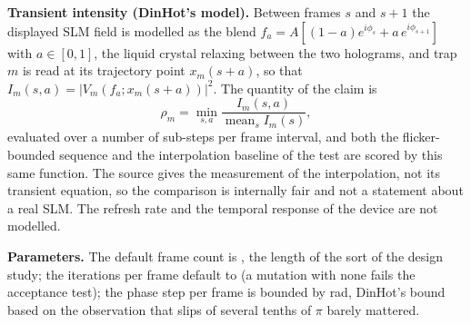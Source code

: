 \textbf{Transient intensity (DinHot's model).} Between frames $s$ and $s+1$ the displayed SLM field is modelled as the blend $f_a=A[(1-a)e^{i\phi_s}+a\,e^{i\phi_{s+1}}]$ with $a\in[0,1]$, the liquid crystal relaxing between the two holograms, and trap $m$ is read at its trajectory point $x_m(s+a)$, so that $I_m(s,a)=|V_m(f_a;x_m(s+a))|^2$. The quantity of the claim is
\begin{equation}
\rho_m=\min_{s,a}\frac{I_m(s,a)}{\operatorname{mean}_sI_m(s)},
\label{eq:b2-ratio}
\end{equation}
evaluated over a number of sub-steps per frame interval, and both the flicker-bounded sequence and the interpolation baseline of the test are scored by this same function. The source gives the measurement of the interpolation, not its transient equation, so the comparison is internally fair and not a statement about a real SLM. The refresh rate and the temporal response of the device are not modelled.

\textbf{Parameters.} The default frame count is , the length of the sort of the design study; the iterations per frame default to  (a mutation with none fails the acceptance test); the phase step per frame is bounded by  rad, DinHot's bound based on the observation that slips of several tenths of $\pi$ barely mattered.

